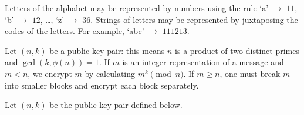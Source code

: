 \documentclass[12pt]{exam}
\newcommand{\Z}{\mathbb Z}
\begin{document}
\begin{questions}
  \question Letters of the alphabet may be represented by numbers using the rule `a' $\to$ $11$, `b' $\to$ $12$, \ldots, `z' $\to$ $36$. Strings of letters may be represented by juxtaposing the codes of the letters. For example, `abc' $\to$ $111213$.
  
  Let $(n,k)$ be a public key pair: this means $n$ is a product of two distinct primes and $\gcd(k,\phi(n))=1$. If $m$ is an integer representation of a message and $m<n$, we encrypt $m$ by calculating $m^k\pmod{n}$. If $m\geq n$, one must break $m$ into smaller blocks and encrypt each block separately.
  \newpage
  \question Let $(n,k)$ be the public key pair defined below.
  \newpage
  \question 
\end{questions}
\end{document}
